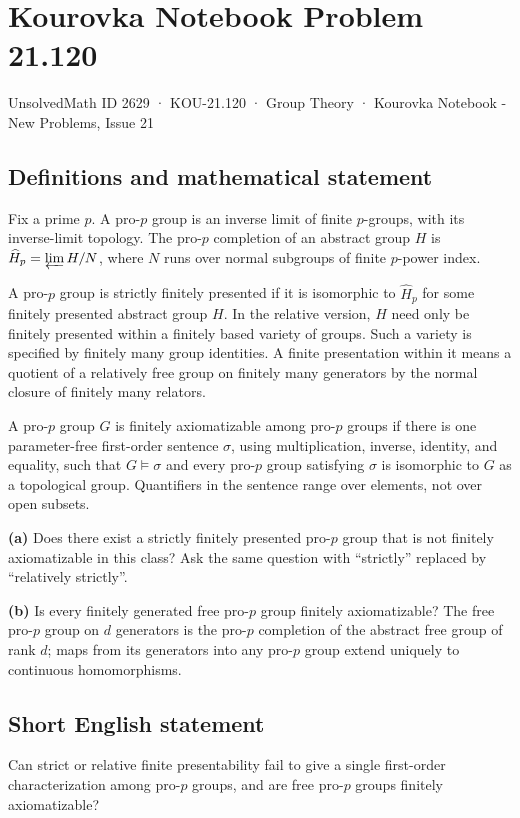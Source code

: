 \documentclass[11pt,a4paper]{article}
\begin{document}
\section*{Kourovka Notebook Problem 21.120}\label{2629}
{\small UnsolvedMath ID 2629 · KOU-21.120 · Group Theory · Kourovka Notebook - New Problems, Issue 21}
\subsection{Definitions and mathematical statement}
Fix a prime $p$. A pro-$p$ group is an inverse limit of finite $p$-groups, with its inverse-limit topology. The pro-$p$ completion of an abstract group $H$ is $\widehat H_p=\varprojlim H/N$, where $N$ runs over normal subgroups of finite $p$-power index.

A pro-$p$ group is strictly finitely presented if it is isomorphic to $\widehat H_p$ for some finitely presented abstract group $H$. In the relative version, $H$ need only be finitely presented within a finitely based variety of groups. Such a variety is specified by finitely many group identities. A finite presentation within it means a quotient of a relatively free group on finitely many generators by the normal closure of finitely many relators.

A pro-$p$ group $G$ is finitely axiomatizable among pro-$p$ groups if there is one parameter-free first-order sentence $\sigma$, using multiplication, inverse, identity, and equality, such that $G\models\sigma$ and every pro-$p$ group satisfying $\sigma$ is isomorphic to $G$ as a topological group. Quantifiers in the sentence range over elements, not over open subsets.

\textbf{(a)} Does there exist a strictly finitely presented pro-$p$ group that is not finitely axiomatizable in this class? Ask the same question with ``strictly'' replaced by ``relatively strictly''.

\textbf{(b)} Is every finitely generated free pro-$p$ group finitely axiomatizable? The free pro-$p$ group on $d$ generators is the pro-$p$ completion of the abstract free group of rank $d$; maps from its generators into any pro-$p$ group extend uniquely to continuous homomorphisms.
\subsection{Short English statement}
Can strict or relative finite presentability fail to give a single first-order characterization among pro-$p$ groups, and are free pro-$p$ groups finitely axiomatizable?
\end{document}
